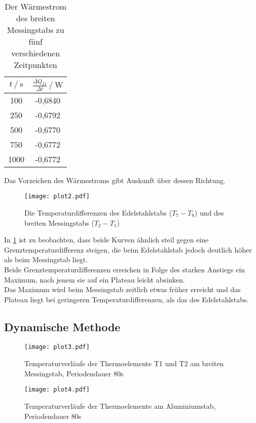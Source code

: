 \begin{table}[H]   %
  \centering
  \caption{Der Wärmestrom des breiten Messingstabs zu fünf verschiedenen Zeitpunkten}
  \begin{tabular}{cc}
    \toprule
    {$t \mathbin{/} \unit{\second}$} &
    {$\frac{\Delta Q_{21}}{\Delta t} \mathbin{/} \unit{\watt}$} \\
    \midrule
     100 & -0,6840 \\
     250 & -0,6792 \\
     500 & -0,6770 \\
     750 & -0,6772 \\
    1000 & -0,6772 \\   
    \bottomrule
  \end{tabular}
  \label{tab:TabelleA2}
\end{table}
\noindent Das Vorzeichen des Wärmestroms gibt Auskunft über dessen Richtung.\\


\begin{figure}[H]
  \centering
  \texttt{[image: plot2.pdf]}
  \caption{Die Temperaturdifferenzen des Edelstahlstabs ($T_7 - T_8$) und des breiten Messingstabs ($T_2 - T_1$)}
  \label{fig:plot2}
\end{figure}
\noindent In \ref{fig:plot2} ist zu beobachten, dass beide Kurven ähnlich 
steil gegen eine Grenztemperaturdifferenz steigen, die beim Edelstahlstab jedoch deutlich höher
als beim Messingstab liegt.\\ 
Beide Grenztemperaturdifferenzen erreichen in Folge des 
starken Anstiegs ein Maximum, nach jenem sie auf ein Plateau leicht absinken. \\
Das Maximum wird beim Messingstab zeitlich etwas früher erreicht und das Plateau liegt bei 
geringeren Temperaturdifferenzen, als das des Edelstahlstabs.\\


\subsection{Dynamische Methode}
\label{Dynamische Methode}

\begin{figure}
  \centering
  \texttt{[image: plot3.pdf]}
  \caption{Temperaturverläufe der Thermoelemente T1 und T2 am breiten Messingstab, Periodendauer 80s}
  \label{fig:plot3}
\end{figure}

\begin{figure}
  \centering
  \texttt{[image: plot4.pdf]}
  \caption{Temperaturverläufe der Thermoelemente am Aluminiumstab, Periodendauer 80s}
  \label{fig:plot4}
\end{figure}

